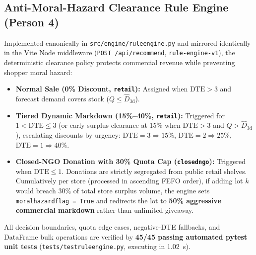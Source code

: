 \documentclass[11pt,a4paper]{article}
\renewcommand{\_}{\oldunderscore\allowbreak}
\begin{document}
\subsection{Anti-Moral-Hazard Clearance Rule Engine (Person 4)}
Implemented canonically in \texttt{src/engine/rule\_engine.py} and mirrored identically in the Vite Node middleware (\texttt{POST /api/recommend}, \texttt{rule-engine-v1}), the deterministic clearance policy protects commercial revenue while preventing shopper moral hazard:
\begin{itemize}[leftmargin=18pt, itemsep=2pt]
    \item \textbf{Normal Sale (0\% Discount, \texttt{retail}):} Assigned when $\text{DTE} > 3$ and forecast demand covers stock ($Q \le \hat{D}_{3\text{d}}$).
    \item \textbf{Tiered Dynamic Markdown (15\%--40\%, \texttt{retail}):} Triggered for $1 < \text{DTE} \le 3$ (or early surplus clearance at 15\% when $\text{DTE} > 3$ and $Q > \hat{D}_{3\text{d}}$), escalating discounts by urgency: $\text{DTE}=3 \Rightarrow 15\%$, $\text{DTE}=2 \Rightarrow 25\%$, $\text{DTE}=1 \Rightarrow 40\%$.
    \item \textbf{Closed-NGO Donation with 30\% Quota Cap (\texttt{closed\_ngo}):} Triggered when $\text{DTE} \le 1$. Donations are strictly segregated from public retail shelves. Cumulatively per store (processed in ascending FEFO order), if adding lot $k$ would breach $30\%$ of total store surplus volume, the engine sets \texttt{moral\_hazard\_flag = True} and redirects the lot to \textbf{50\% aggressive commercial markdown} rather than unlimited giveaway.
\end{itemize}
All decision boundaries, quota edge cases, negative-DTE fallbacks, and DataFrame bulk operations are verified by \textbf{45/45 passing automated pytest unit tests} (\texttt{tests/test\_rule\_engine.py}, executing in 1.02~s).
\end{document}
